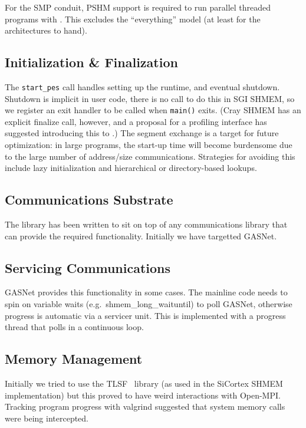 For the SMP conduit, PSHM support is required to run parallel threaded
programs with \openshmem. This excludes the ``everything'' model (at
least for the architectures to hand).

\subsection{\openshmem Initialization \& Finalization}

The \texttt{start\_pes} call handles setting up the \openshmem runtime,
and eventual shutdown. Shutdown is implicit in user code, there is no
call to do this in SGI SHMEM, so we register an exit handler to be
called when \texttt{main()} exits. (Cray SHMEM has an explicit
finalize call, however, and a proposal for a profiling interface has
suggested introducing this to \openshmem.) The segment exchange is a
target for future optimization: in large programs, the start-up time
will become burdensome due to the large number of address/size
communications. Strategies for avoiding this include lazy
initialization and hierarchical or directory-based lookups.

\subsection{Communications Substrate}

The \openshmem library has been written to sit on top of any
communications library that can provide the required
functionality. Initially we have targetted GASNet.

\subsection{Servicing Communications}

GASNet provides this functionality in some cases. The mainline code
needs to spin on variable waits (e.g.\ shmem\_long\_waituntil) to poll
GASNet, otherwise progress is automatic via a servicer unit.  This is
implemented with a progress thread that polls in a continuous loop.

\subsection{Memory Management}

Initially we tried to use the TLSF~\cite{tlsf} library (as used in the
SiCortex SHMEM implementation) but this proved to have weird
interactions with Open-MPI. Tracking program progress with valgrind
\cite{valgrind} suggested that system memory calls were being
intercepted.

